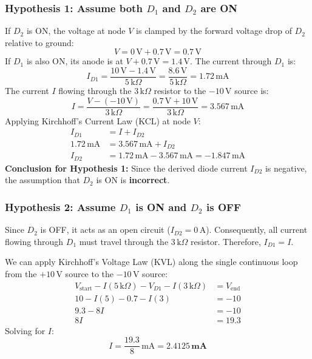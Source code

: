 \documentclass[12pt,a3paper]{article}
\begin{document}
\begin{enumerate}
\begin{tcolorbox}[enhanced,breakable,ansbox,colback=cA!4,colframe=cA,boxrule=0.8pt,arc=5pt,title={\textbf{Answer}},fonttitle=\bfseries\color{white},colbacktitle=cA]
\subsubsection*{Hypothesis 1: Assume both $D_1$ and $D_2$ are ON}
If $D_2$ is ON, the voltage at node $V$ is clamped by the forward voltage drop of $D_2$ relative to ground:
\begin{equation}
    V = 0\,\text{V} + 0.7\,\text{V} = 0.7\,\text{V}
\end{equation}
If $D_1$ is also ON, its anode is at $V + 0.7\,\text{V} = 1.4\,\text{V}$. The current through $D_1$ is:
\begin{equation}
    I_{D1} = \frac{10\,\text{V} - 1.4\,\text{V}}{5\,\text{k}\Omega} = \frac{8.6\,\text{V}}{5\,\text{k}\Omega} = 1.72\,\text{mA}
\end{equation}
The current $I$ flowing through the $3\,\text{k}\Omega$ resistor to the $-10\,\text{V}$ source is:
\begin{equation}
    I = \frac{V - (-10\,\text{V})}{3\,\text{k}\Omega} = \frac{0.7\,\text{V} + 10\,\text{V}}{3\,\text{k}\Omega} = 3.567\,\text{mA}
\end{equation}
Applying Kirchhoff's Current Law (KCL) at node $V$:
\begin{align}
    I_{D1} &= I + I_{D2} \nonumber \\
    1.72\,\text{mA} &= 3.567\,\text{mA} + I_{D2} \nonumber \\
    I_{D2} &= 1.72\,\text{mA} - 3.567\,\text{mA} = -1.847\,\text{mA}
\end{align}
\textbf{Conclusion for Hypothesis 1:} Since the derived diode current $I_{D2}$ is negative, the assumption that $D_2$ is ON is \textbf{incorrect}.

\vspace{0.5cm}

\subsubsection*{Hypothesis 2: Assume $D_1$ is ON and $D_2$ is OFF}
Since $D_2$ is OFF, it acts as an open circuit ($I_{D2} = 0\,\text{A}$). Consequently, all current flowing through $D_1$ must travel through the $3\,\text{k}\Omega$ resistor. Therefore, $I_{D1} = I$.

We can apply Kirchhoff's Voltage Law (KVL) along the single continuous loop from the $+10\,\text{V}$ source to the $-10\,\text{V}$ source:
\begin{align}
    V_{\text{start}} - I(5\,\text{k}\Omega) - V_{D1} - I(3\,\text{k}\Omega) &= V_{\text{end}} \nonumber \\
    10 - I(5) - 0.7 - I(3) &= -10 \nonumber \\
    9.3 - 8I &= -10 \nonumber \\
    8I &= 19.3
\end{align}
Solving for $I$:
\begin{equation}
    I = \frac{19.3}{8}\,\text{mA} = \mathbf{2.4125\,\text{mA}}
\end{equation}


\end{tcolorbox}
\end{enumerate}
\end{document}
